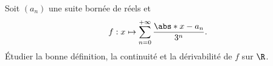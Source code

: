 \begin{enonce}
\begin{exercise}[ID={RMS126 E509},subtitle={Mines-Ponts PSI 2015},tags={}]
Soit $\left( a_n \right)$ une suite bornée de réels et 
\begin{equation*}
  f:x\mapsto \sum_{n=0}^{+\infty} \frac{\abs*{x - a_n}}{3^n}.
\end{equation*}
Étudier la bonne définition, la continuité et la dérivabilité de $f$ sur $\R$.
\end{exercise}
\begin{solution}
\end{solution}
\end{enonce}
